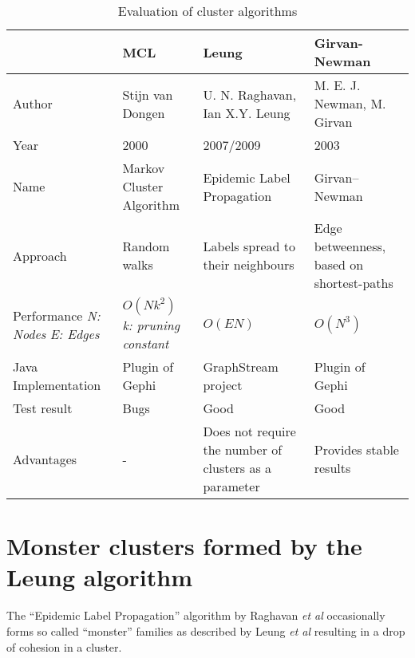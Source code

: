 \begin{table}[H]
\centering
\caption{Evaluation of cluster algorithms}
\label{tab:clusterAlgorithms}
\begin{tabular}{|p{2cm}|p{4cm}|p{4cm}|p{4cm}|}
\hline
                    & \textbf{MCL}               & \textbf{Leung}                    & \textbf{Girvan-Newman}  \\ \hline
Author              & Stijn van Dongen\cite{markovCluster} & U. N. Raghavan\cite{raghavan}, Ian X.Y. Leung\cite{leung}    & M. E. J. Newman, M. Girvan\cite{girvan} \\ \hline
Year                & 2000                       & 2007/2009                         & \multicolumn{1}{l|}{2003}                       \\ \hline
Name                & Markov Cluster Algorithm   & Epidemic Label Propagation        & \multicolumn{1}{l|}{Girvan–Newman}              \\ \hline
Approach            & Random walks               & Labels spread to their neighbours & Edge betweenness, based on shortest-paths       \\ \hline
Performance \newline \textit{N: Nodes} \newline \textit{E: Edges}         & $O (N k^2)$ \newline \textit{k: pruning constant} \cite[p.126]{markovCluster} & $O( E N )$ \cite[p.3]{leung}                         & $O ( N^3 )$\cite[p.14]{girvan}       \\ \hline
Java Implementation & Plugin of Gephi\cite{gephiMarkov} & GraphStream project\cite{leungGraphstream} & Plugin of Gephi\cite{gephiMarkov} \\ \hline
Test result         & Bugs                       & Good                              & \multicolumn{1}{l|}{Good}                       \\ \hline
Advantages & - & Does not require the number of clusters as a parameter & Provides stable results \\
 \hline
\end{tabular}
\end{table}

\section{Monster clusters formed by the Leung algorithm}
\label{sec:monsterclusters}

The \enquote{Epidemic Label Propagation} algorithm by Raghavan \textit{et al} occasionally forms so called \enquote{monster} families as described by Leung \textit{et al} resulting in a drop of cohesion in a cluster. 

